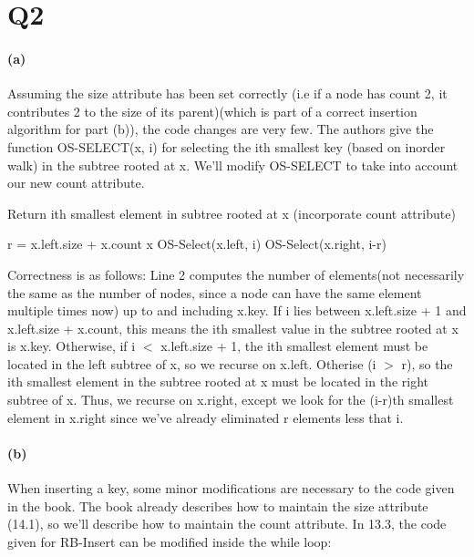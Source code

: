 \documentclass[11pt,a4paper]{article}
\begin{document}
\newpage
\section*{Q2}

	\paragraph{(a)}
	Assuming the size attribute has been set correctly (i.e if a node has count 2, it contributes 2 to the size of its parent)(which is part of a correct insertion algorithm for part (b)), the code changes are very few. The authors give the function OS-SELECT(x, i) for selecting the ith smallest key (based on inorder walk) in the subtree rooted at x. We'll modify OS-SELECT to take into account our new count attribute.
	
\begin{algorithm}
\caption{Return ith smallest element in subtree rooted at x (incorporate count attribute)}
\begin{algorithmic}[1]
	\State r = x.left.size + x.count
		\State \Return x
		\State \Return OS-Select(x.left, i)
	\Else 
		\State \Return OS-Select(x.right, i-r)
	\EndIf
\EndFunction
\end{algorithmic}
\end{algorithm}

Correctness is as follows: \newline
Line 2 computes the number of elements(not necessarily the same as the number of nodes, since a node can have the same element multiple times now) up to and including x.key. If i lies between x.left.size + 1 and x.left.size + x.count, this means the ith smallest value in the subtree rooted at x is x.key.  \newline
Otherwise, if i $<$ x.left.size + 1, the ith smallest element must be located in the left subtree of x, so we recurse on x.left. \newline
Otherise (i $>$ r), so the ith smallest element in the subtree rooted at x must be located in the right subtree of x. Thus, we recurse on x.right, except we look for the (i-r)th smallest element in x.right since we've already eliminated r elements less that i.

	\paragraph{(b)}
When inserting a key, some minor modifications are necessary to the code given in the book. The book already describes how to maintain the size attribute (14.1), so we'll describe how to maintain the count attribute. In 13.3, the code given for RB-Insert can be modified inside the while loop:
	
\end{document}
